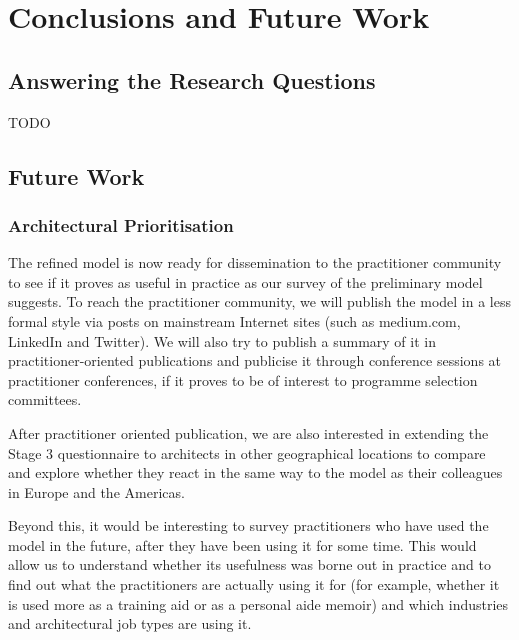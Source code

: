 \chapter{Conclusions and Future Work}

\section{Answering the Research Questions}

TODO

\section{Future Work}

\subsection{Architectural Prioritisation}

The refined model is now ready for dissemination to the practitioner community to see if it proves as useful in practice as our survey of the preliminary model suggests.  To reach the practitioner community, we will publish the model in a less formal style via posts on mainstream Internet sites (such as medium.com, LinkedIn and Twitter).  We will also try to publish a summary of it in practitioner-oriented publications and publicise it through conference sessions at practitioner conferences, if it proves to be of interest to programme selection committees.

After practitioner oriented publication, we are also interested in extending the Stage 3 questionnaire to architects in other geographical locations to compare and explore whether they react in the same way to the model as their colleagues in Europe and the Americas.

Beyond this, it would be interesting to survey practitioners who have used the model in the future, after they have been using it for some time.  This would allow us to understand whether its usefulness was borne out in practice and to find out what the practitioners are actually using it for (for example, whether it is used more as a training aid or as a personal aide memoir) and which industries and architectural job types are using it.